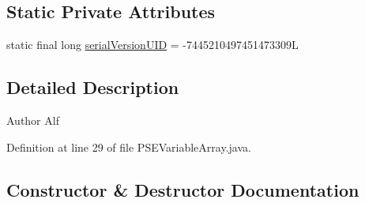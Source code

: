 \subsection*{Static Private Attributes}
\begin{DoxyCompactItemize}
\item 
static final long \hyperlink{classgov_1_1nasa_1_1jpf_1_1inspector_1_1common_1_1pse_1_1_p_s_e_variable_array_ace1c233664c5489a4f5085068a75c0ed}{serial\+Version\+U\+ID} = -\/7445210497451473309L
\end{DoxyCompactItemize}


\subsection{Detailed Description}
\begin{DoxyAuthor}{Author}
Alf 
\end{DoxyAuthor}


Definition at line 29 of file P\+S\+E\+Variable\+Array.\+java.



\subsection{Constructor \& Destructor Documentation}
